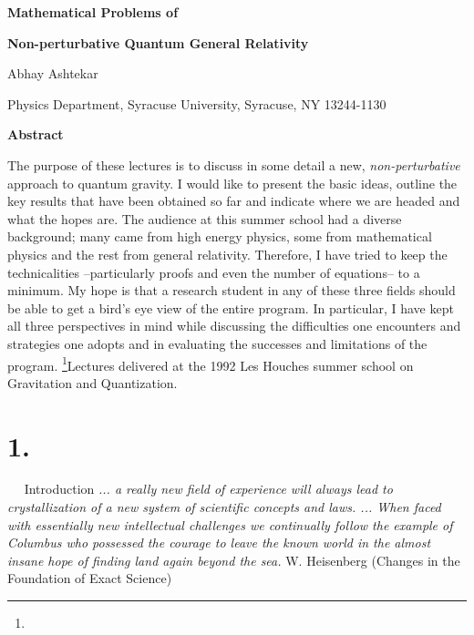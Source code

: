       \def\ab{{\alpha\beta}}
      \def\bra#1{\langle\, #1\, |}
      \def\comp{{\rm C}\llap{\vrule height7.1pt width1pt depth-.4pt\phantom t}}
      \def\conj{{\displaystyle\ast}}
      \def\covD{{\rm I\!D}}
      \def\d{\partial}
      \def\D{{\cal D}}
      \def\Div{{\rm Div}}
      \def\fD{{}^4\!{\cal D}}
      \def\half{{\textstyle{1\over2}}}
      \def\implies{\Rightarrow}
      \def\IP#1#2{\langle\, #1\, |\, #2\, \rangle}
      \def\ket#1{|\, #1\, \rangle}
      \def\Lapop{\displaystyle{{\hbox to 0pt{$\sqcup$\hss}}\sqcap}}
      \def\Lie#1{{\cal L}_{\tenrm #1}}
      \def\lint{\int\nolimits}
      \def\loint{\oint\nolimits}
      \def\nab{\nabla\!}
      \def\ovr{\overline}
      \def\real{{\rm I\!R}}
      \def\to{\rightarrow}
      \def\tr{\mathop{\rm tr}}
      \def\tw{\widetilde}
      \def\und{\underline}
      \def\ut#1{\rlap{\lower1ex\hbox{$\sim$}}#1{}}
      \def\zero#1{{\buildrel\circ\over{#1}}{}}


\centerline{\bf Mathematical Problems of}
\centerline{\bf  Non-perturbative Quantum General Relativity}
\bigskip
\centerline{Abhay Ashtekar}
\smallskip
\centerline{Physics Department, Syracuse University, Syracuse, NY 13244-1130}
\bigskip

\centerline{\bf Abstract}

The purpose of these lectures is to discuss in some detail a
new, {\it non-perturbative} approach to quantum gravity. I would like to
present the basic ideas, outline the key results that have
been obtained so far and indicate where we are headed and what the hopes
are. The audience at this summer school had a diverse background; many
came from high energy physics, some from mathematical physics and the rest
from general relativity. Therefore, I have tried to keep the technicalities
--particularly proofs and even the number of equations-- to a minimum.
My hope is that a research student in any of these three fields should be
able to get a bird's eye view of the entire program. In particular, I have
kept all three perspectives in mind while discussing the difficulties one
encounters and strategies one adopts and in evaluating the successes
and limitations of the program.
\footnote{}{Lectures delivered at the 1992 Les Houches summer school on
Gravitation and Quan\-ti\-za\-tion.}
\vfill\break


%
%
\section{1.}{${}\quad$ Introduction}%
\medskip
{\narrower\narrower\smallskip\noindent
{\sl ... a really new field of experience will always lead to
crystallization of a new system of scientific concepts and laws.  ...
When faced with essentially new intellectual challenges we continually
follow the example of Columbus who possessed the courage to leave the known
world in the almost insane hope of finding land again beyond the sea.}
\smallskip
W. Heisenberg (Changes in the Foundation of Exact Science)\smallskip}
\medskip

